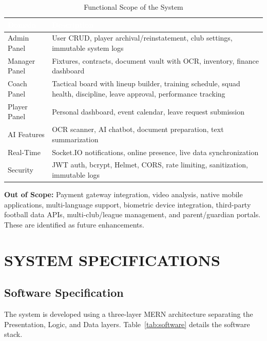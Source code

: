 \documentclass[12pt,a4paper,oneside]{report}
\begin{document}
\begin{table}[H]
\centering
\caption{Functional Scope of the System}
\label{tab:scope}
\small
\begin{tabularx}{\textwidth}{|l|X|}
\hline
\rowcolor{tableHeader}\textcolor{white}{\textbf{Domain}} & \textcolor{white}{\textbf{Description}} \\
\hline
Admin Panel     & User CRUD, player archival/reinstatement, club settings, immutable system logs \\
\hline
\rowcolor{tableRow}
Manager Panel   & Fixtures, contracts, document vault with OCR, inventory, finance dashboard \\
\hline
Coach Panel     & Tactical board with lineup builder, training schedule, squad health, discipline, leave approval, performance tracking \\
\hline
\rowcolor{tableRow}
Player Panel    & Personal dashboard, event calendar, leave request submission \\
\hline
AI Features     & OCR scanner, AI chatbot, document preparation, text summarization \\
\hline
\rowcolor{tableRow}
Real-Time       & Socket.IO notifications, online presence, live data synchronization \\
\hline
Security        & JWT auth, bcrypt, Helmet, CORS, rate limiting, sanitization, immutable logs \\
\hline
\end{tabularx}
\end{table}

\noindent\textbf{Out of Scope:} Payment gateway integration, video analysis, native mobile applications, multi-language support, biometric device integration, third-party football data APIs, multi-club/league management, and parent/guardian portals. These are identified as future enhancements.

\chapter{SYSTEM SPECIFICATIONS}

\section{Software Specification}

The system is developed using a three-layer MERN architecture separating the Presentation, Logic, and Data layers. Table~\ref{tab:software} details the software stack.
\end{document}
